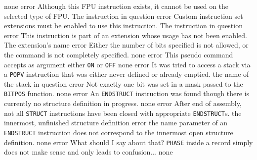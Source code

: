\documentclass[12pt,twoside]{report}
\newcommand{\tty}[1]{{\tt #1}}
\begin{document}
\begin{description}
               {none}
               {error}
               {Although this FPU instruction exists, it cannot be used on
                the selected type of FPU.}
               {The instruction in question}
               {error}
               {Custom instruction set extensions must be enabled
                to use this instruction.}
               {The instruction in question}
               {error}
               {This instruction is part of an extension whose
                usage has not been enabled.}
               {The extension's name}
               {error}
               {Either the number of bits specified is not allowed, or
                the command is not completely specified.}
               {none}
               {error}
               {This pseudo command accepts as argument either \tty{ON} or
                \tty{OFF}}
               {none}
               {error}
               {It was tried to access a stack via a \tty{POPV} instruction
                that was either never defined or already emptied.}
               {the name of the stack in question}
               {error}
               {Not exactly one bit was set in a mask passed to the
                \tty{BITPOS} function.}
               {none}
               {error}
               {An \tty{ENDSTRUCT} instruction was found though there is
                currently no structure definition in progress.}
               {none}
               {error}
               {After end of assembly, not all \tty{STRUCT} instructions
                have been closed with appropriate \tty{ENDSTRUCT}s.}
               {the innermost, unfinished structure definition}
               {error}
               {the name parameter of an \tty{ENDSTRUCT} instruction does
                not correspond to the innermost open structure
                definition.}
               {none}
               {error}
               {What should I say about that?  \tty{PHASE} inside a record
                simply does not make sense and only leads to
                confusion...}
               {none}
\errentry{1554}{invalid \tty{STRUCT} directive}

\end{description}
\end{document}
